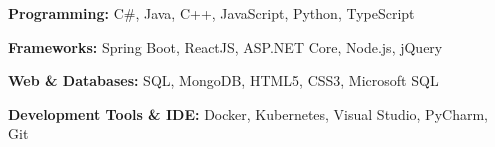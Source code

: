 \begin{onecolentry}
    \textbf{Programming:} C\#, Java, C++, JavaScript, Python, TypeScript
\end{onecolentry}
\vspace{0.1 cm}
\begin{onecolentry}
    \textbf{Frameworks:} Spring Boot, ReactJS, ASP.NET Core, Node.js, jQuery
\end{onecolentry}
\vspace{0.1 cm}
\begin{onecolentry}
    \textbf{Web \& Databases:} SQL, MongoDB, HTML5, CSS3, Microsoft SQL
\end{onecolentry}
\vspace{0.1 cm}
\begin{onecolentry}
    \textbf{Development Tools \& IDE:} Docker, Kubernetes, Visual Studio, PyCharm, Git
\end{onecolentry}